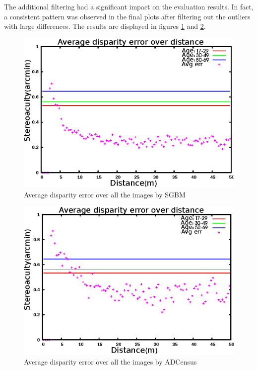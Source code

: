The additional filtering had a significant impact on the evaluation results. In fact, a consistent pattern was observed in the final plots after filtering out the
outliers with large differences. The results are displayed in
figures \ref{fig:mskmapsgbm} and \ref{fig:mskmapadc}.

\begin{figure}[H]
\centering
\includegraphics[scale=0.8]{sgbmmsk3}
\caption{Average disparity error over all the images by SGBM}
\label{fig:mskmapsgbm}
\end{figure} 

\begin{figure}[H]
\centering
\includegraphics[scale=0.8]{adcenmsk3}
\caption{Average disparity error over all the images by ADCensus}
\label{fig:mskmapadc}
\end{figure} 

